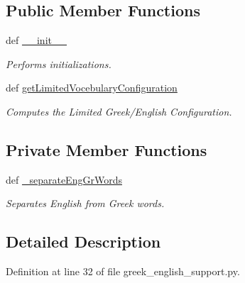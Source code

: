 \subsection*{Public Member Functions}
\begin{DoxyCompactItemize}
\item 
def \hyperlink{classrapp__speech__detection__sphinx4_1_1greek__english__support_1_1GreekEnglishSupport_aaa246998bacdfca53c35c239b97da70d}{\-\_\-\-\_\-init\-\_\-\-\_\-}
\begin{DoxyCompactList}\small\item\em Performs initializations. \end{DoxyCompactList}\item 
def \hyperlink{classrapp__speech__detection__sphinx4_1_1greek__english__support_1_1GreekEnglishSupport_a6fb36676d5b897dfb4688db3f47cdc06}{get\-Limited\-Vocebulary\-Configuration}
\begin{DoxyCompactList}\small\item\em Computes the Limited Greek/\-English Configuration. \end{DoxyCompactList}\end{DoxyCompactItemize}
\subsection*{Private Member Functions}
\begin{DoxyCompactItemize}
\item 
def \hyperlink{classrapp__speech__detection__sphinx4_1_1greek__english__support_1_1GreekEnglishSupport_aab001791e455f86ee1c970fa1c76db84}{\-\_\-separate\-Eng\-Gr\-Words}
\begin{DoxyCompactList}\small\item\em Separates English from Greek words. \end{DoxyCompactList}\end{DoxyCompactItemize}


\subsection{Detailed Description}


Definition at line 32 of file greek\-\_\-english\-\_\-support.\-py.



